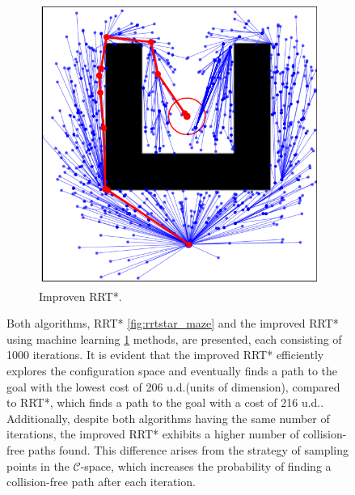 \documentclass{ctuthesis}
\begin{document}
\begin{figure}[!ht]
\begin{subfigure}[b]{0.45\textwidth}
      \includegraphics[width=\textwidth]{figChap4/RRTstarML_maze206.0.pdf}
      \caption{Improven RRT*.}
      \label{fig:rrtstarML_maze}
  \end{subfigure}
  \caption{
    Both algorithms, RRT* \ref{fig:rrtstar_maze} and 
    the improved RRT* using machine learning \ref{fig:rrtstarML_maze} methods, are presented, 
    each consisting of 1000 iterations. 
    It is evident that the improved RRT* efficiently explores the configuration space and 
    eventually finds a path to the goal with the lowest cost of 206 u.d.(units of dimension), 
    compared to RRT*, which finds a path to the goal with a cost of 216 u.d.. 
    Additionally, despite both algorithms having the same number of iterations, 
    the improved RRT* exhibits a higher number of collision-free paths found. 
    This difference arises from the strategy of sampling points in the $\mathcal{C}$-space, 
    which increases the probability of finding a collision-free path after each iteration.}
  \label{fig:RRTstar_vs_RRTstarML}
\end{figure}
\end{document}

